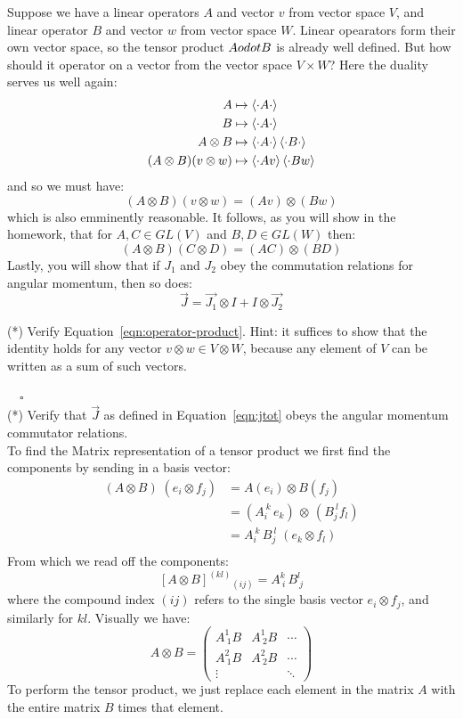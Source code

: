 \documentclass[12pt]{article}
\begin{document}
Suppose we have a linear operators $A$ and vector $v$ from vector
space $V$, and linear operator $B$ and vector $w$ from vector space
$W$.  Linear opearators form their own vector space, so the tensor product $A \\odot B$ is already well defined.  But how should it operator on a vector from the vector space $V \times W$?  Here the duality serves us well again:
\begin{align*}
  A &\mapsto \braket{\cdot A \cdot }\\
  B &\mapsto \braket{\cdot A \cdot }\\
  A \otimes B &\mapsto \braket{\cdot A \cdot } \braket{\cdot B \cdot }\\
  (A \otimes B)(v \otimes w) &\mapsto \braket{\cdot A v} \braket{\cdot B w }
\end{align*}
and so we must have:
$$(A \otimes B)(v \otimes w) = (Av) \otimes (Bw)$$
which is also emminently reasonable.
It follows, as you will show in the homework, that for $A,C \in GL(V)$
and $B,D \in GL(W)$ then:
\begin{equation}
\label{eqn:operator-product}
(A \otimes B) (C \otimes D) = (AC) \otimes (BD) 
\end{equation}
Lastly, you will show that if $J_1$ and $J_2$ obey the commutation
relations for angular momentum, then so does:
\begin{equation}
\label{eqn:jtot}  
\vec{J} = \vec{J_1} \otimes I + I \otimes \vec{J_2}
\end{equation}

\exercise (*) Verify Equation~\ref{eqn:operator-product}.  Hint: it
suffices to show that the identity holds for any vector $v \otimes w
\in V \otimes W$, because any element of $V$ can be written as a sum
of such vectors.


$\quad \square$\\[5pt]

\exercise (*) Verify that $\vec{J}$ as defined in
Equation~\ref{eqn:jtot} obeys the angular momentum
commutator relations.\\[5pt]


To find the Matrix representation of a tensor product we first find the components by sending in a basis vector:
\begin{align*}
  (A \otimes B) \; (e_i \otimes f_j) &= A(e_i) \otimes B(f_j)\\
  &= (A_i^{\ k} \, e_k) \, \otimes \, (B_j^{\ l} f_l)\\
  &= A_i^{\ k} \, B_j^{\ l} \; (e_k \otimes f_l)\\
\end{align*}
From which we read off the components:
$$[A \otimes B]^{(kl)}{}_{(ij)} = A^k_{\ i} \, B^l_{\ j}$$
where the compound index $(ij)$ refers to the single basis vector $e_i \otimes f_j$, and similarly for $kl$. Visually we have:
$$A \otimes B = \begin{pmatrix} 
A^1_{\ 1} B & A^1_{\ 2} B & \cdots \\ 
A^2_{\ 1} B & A^2_{\ 2} B & \cdots \\ 
\vdots & & \ddots 
\end{pmatrix}$$
To perform the tensor product, we just replace each element in the matrix $A$ with the entire matrix $B$ times that element.
\end{document}
